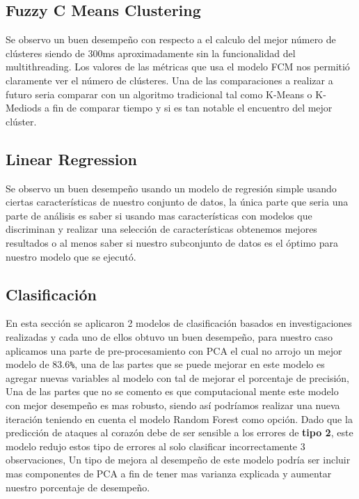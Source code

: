 \documentclass[10pt,journal]{IEEEtran}
\begin{document}
\subsection{Fuzzy C Means Clustering}

Se observo un buen desempeño con respecto a el calculo del mejor número de clústeres siendo de 300ms aproximadamente sin la funcionalidad del multithreading. Los valores de las métricas que usa el modelo FCM nos permitió claramente ver el número de clústeres.  Una de las comparaciones a realizar a futuro seria comparar con un algoritmo tradicional tal como K-Means o K-Mediods a fin de comparar tiempo y si es tan notable el encuentro del mejor clúster.

\subsection{Linear Regression}


Se observo un buen desempeño usando un modelo de regresión simple usando ciertas características de nuestro conjunto de datos, la única parte que seria una parte de análisis es saber si usando mas características con modelos que discriminan y realizar una selección de características obtenemos mejores resultados o al menos saber si nuestro subconjunto de datos es el óptimo para nuestro modelo que se ejecutó.

\subsection{Clasificación}

En esta sección se aplicaron 2 modelos de clasificación basados en investigaciones realizadas y cada uno de ellos obtuvo un buen desempeño, para nuestro caso aplicamos una parte de pre-procesamiento con PCA el cual no arrojo un mejor modelo de 83.6\verb|%|, una de las partes que se puede mejorar en este modelo es agregar nuevas variables al modelo con tal de mejorar el porcentaje de precisión, Una de las partes que no se comento es que computacional mente este modelo con mejor desempeño es mas robusto, siendo así podríamos realizar una nueva iteración teniendo en cuenta el modelo Random Forest como opción. Dado que la predicción de ataques al corazón debe de ser sensible a los errores de \textbf{tipo 2}, este modelo redujo estos tipo de errores al solo clasificar incorrectamente 3 observaciones, Un tipo de mejora al desempeño de este modelo podría ser incluir mas componentes de PCA a fin de tener mas varianza explicada y aumentar nuestro porcentaje de desempeño.
\end{document}
